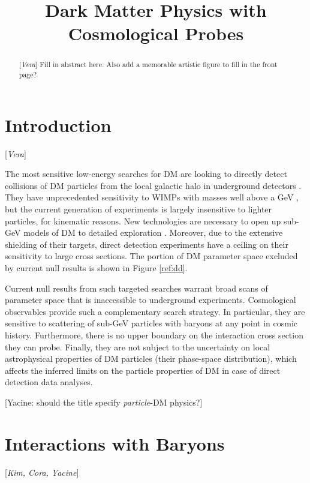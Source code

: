 \documentclass[12pt]{article}
\title{Dark Matter Physics with Cosmological Probes}
\author{}
\newcommand{\Contributors}[1]{ {\footnotesize [\textit{#1}]}}
\begin{document}
\maketitle

\begin{abstract}
\Contributors{Vera}
Fill in abstract here. Also add a memorable artistic figure to fill in the front page?
\end{abstract}

\pagebreak
\section{Introduction}
\Contributors{Vera}

The most sensitive low-energy searches for DM are looking to directly detect collisions of DM particles from the local galactic halo in underground detectors \cite{}. They have unprecedented sensitivity to WIMPs with masses well above a GeV \cite{}, but the current generation of experiments is largely insensitive to lighter particles, for kinematic reasons. New technologies are necessary to open up sub-GeV models of DM to detailed exploration \cite{}. Moreover, due to the extensive shielding of their targets, direct detection experiments have a ceiling on their sensitivity to large cross sections. The portion of DM parameter space excluded by current null results is shown in Figure \ref{ref:dd}. 

Current null results from such targeted searches warrant broad scans of parameter space that is inaccessible to underground experiments. Cosmological observables provide such a complementary search strategy. In particular, they are sensitive to scattering of sub-GeV particles with baryons at any point in cosmic history. Furthermore, there is no upper boundary on the interaction cross section they can probe. Finally, they are not subject to the uncertainty on local astrophysical properties of DM particles (their phase-space distribution), which affects the inferred limits on the particle properties of DM in case of direct detection data analyses. 

[Yacine: should the title specify \emph{particle}-DM physics?]

\section{Interactions with Baryons}
\Contributors{Kim, Cora, Yacine}
\end{document}
